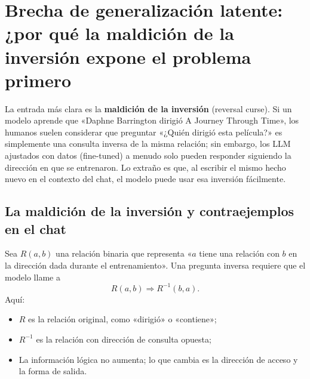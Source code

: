 \section{Brecha de generalización latente: ¿por qué la maldición de la inversión expone el problema primero}

La entrada más clara es la \textbf{maldición de la inversión} (reversal curse). Si un modelo aprende que «Daphne Barrington dirigió A Journey Through Time», los humanos suelen considerar que preguntar «¿Quién dirigió esta película?» es simplemente una consulta inversa de la misma relación; sin embargo, los LLM ajustados con datos (fine-tuned) a menudo solo pueden responder siguiendo la dirección en que se entrenaron. Lo extraño es que, al escribir el mismo hecho nuevo en el contexto del chat, el modelo puede usar esa inversión fácilmente.

\subsection{La maldición de la inversión y contraejemplos en el chat}

Sea $R(a,b)$ una relación binaria que representa «$a$ tiene una relación con $b$ en la dirección dada durante el entrenamiento». Una pregunta inversa requiere que el modelo llame a
$$
R(a,b)\Longrightarrow R^{-1}(b,a).
$$
Aquí:
\begin{itemize}
  \item $R$ es la relación original, como «dirigió» o «contiene»;
  \item $R^{-1}$ es la relación con dirección de consulta opuesta;
  \item La información lógica no aumenta; lo que cambia es la dirección de acceso y la forma de salida.
\end{itemize}




